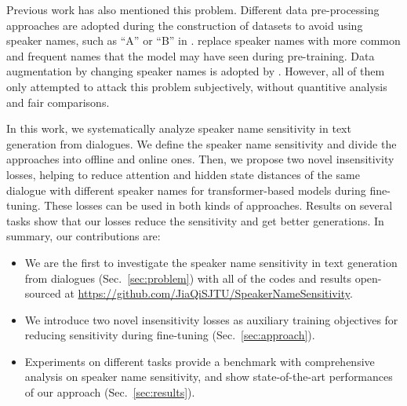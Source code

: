 Previous work has also mentioned this problem. Different data pre-processing approaches are adopted during the construction of datasets to avoid using speaker names, such as ``A'' or ``B'' in \citet{li2017dailydialog}. \citet{khalifa2021bag} replace speaker names with more common and frequent names that the model may have seen during pre-training. Data augmentation by changing speaker names is adopted by \citet{liu2021controllable}.
However, all of them only attempted to attack this problem 
subjectively, without quantitive analysis and fair comparisons. %

In this work, we systematically analyze speaker name sensitivity in text generation from dialogues. We define the speaker name sensitivity and divide the approaches 
into offline and online ones. 
Then, we propose two novel insensitivity losses, helping to reduce attention and hidden state distances of the same dialogue with different speaker names for transformer-based models during fine-tuning. These losses can be used in both kinds of approaches.
Results on several tasks show that
our losses reduce the sensitivity and get better generations. %
In summary, our contributions are:
\begin{itemize}
	\item We are the first to investigate the speaker name sensitivity 
in text generation from dialogues (Sec.~\ref{sec:problem}) with all of the codes and results open-sourced at \url{https://github.com/JiaQiSJTU/SpeakerNameSensitivity}.%
	\item We introduce two novel insensitivity losses as auxiliary training objectives for reducing sensitivity during fine-tuning (Sec.~\ref{sec:approach}).
	\item Experiments on different tasks provide a benchmark with comprehensive analysis on speaker name sensitivity, and show  state-of-the-art performances of our approach
(Sec.~\ref{sec:results}).
\end{itemize}
